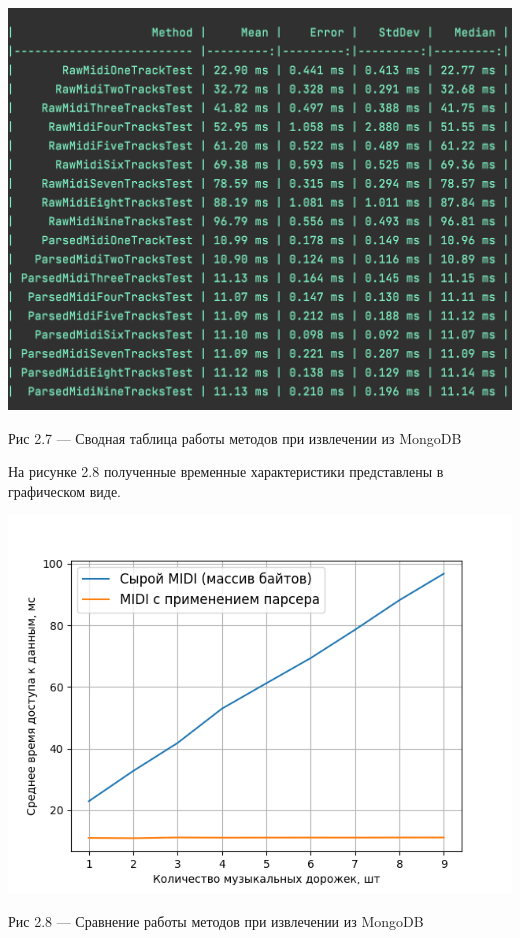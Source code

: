 \begin{center}
		\includegraphics[scale=0.6]{tex/img/FindClean.png}
		
			Рис 2.7 — Сводная таблица работы методов при извлечении из MongoDB
\end{center}

На рисунке 2.8 полученные временные характеристики представлены в графическом виде.

\begin{center}
		\includegraphics[scale=0.7]{tex/img/figure_find_query.png}
		
			Рис 2.8 — Сравнение работы методов при извлечении из MongoDB
\end{center}

